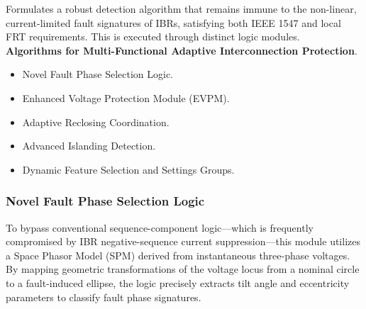 Formulates a robust detection algorithm that remains immune to the non-linear, current-limited fault signatures of IBRs, satisfying both IEEE 1547 and local FRT requirements. This is executed through distinct logic modules. \\
\textbf{Algorithms for Multi-Functional Adaptive Interconnection Protection}.
 \begin{itemize}
        \item Novel Fault Phase Selection Logic. 
        \item Enhanced Voltage Protection Module (EVPM).
        \item Adaptive Reclosing Coordination.
        \item Advanced Islanding Detection.
        \item Dynamic Feature Selection and Settings Groups.
    \end{itemize}





\subsubsection{Novel Fault Phase Selection Logic}
To bypass conventional sequence-component logic—which is frequently compromised by IBR negative-sequence current suppression—this module utilizes a Space Phasor Model (SPM) derived from instantaneous three-phase voltages. By mapping geometric transformations of the voltage locus from a nominal circle to a fault-induced ellipse, the logic precisely extracts tilt angle and eccentricity parameters to classify fault phase signatures.
